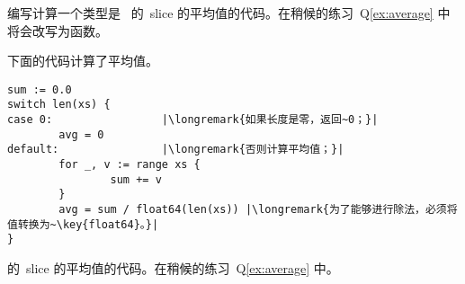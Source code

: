 \begin{Exercise}[title={Average},difficulty=1]
\label{ex:average no func}
\Question\label{ex:average no func q1} 编写计算一个类型是~
 的~slice 的平均值的代码。在稍候的练习~Q\ref{ex:average} 
中将会改写为函数。
\end{Exercise}

\begin{Answer}
\Question 下面的代码计算了平均值。
\begin{lstlisting}
sum := 0.0 
switch len(xs) {
case 0:                 |\longremark{如果长度是零，返回~0；}|
        avg = 0
default:                |\longremark{否则计算平均值；}|
        for _, v := range xs {
                sum += v
        }
        avg = sum / float64(len(xs)) |\longremark{为了能够进行除法，必须将值转换为~\key{float64}。}|
}
\end{lstlisting}
\showremarks
\end{Answer}
 的~slice 的平均值的代码。在稍候的练习~Q\ref{ex:average} 中。
